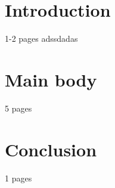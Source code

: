 \documentclass[12pt,a4paper,oneside,titlepage]{article}
\begin{document}
{
\newpage
\centering
\tableofcontents
}


\newpage
\section*{Introduction}
1-2 pages
adssdadas


\newpage
\section*{Main body}
5 pages

\newpage
\section*{Conclusion}
1 pages
%


\newpage
\renewcommand\refname{Bibliography}


\end{document}
